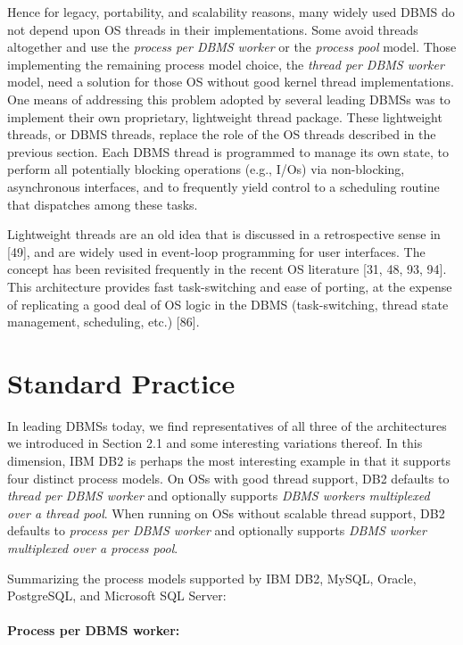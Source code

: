 \documentclass[b5paper,11pt,twoside,openright]{book}
\begin{document}
Hence for legacy, portability, and scalability reasons, many widely used
DBMS do not depend upon OS threads in their implementations. Some avoid
threads altogether and use the \emph{process per DBMS} \emph{worker} or
the \emph{process pool} model. Those implementing the remaining process
model choice, the \emph{thread per DBMS worker} model, need a solution
for those OS without good kernel thread implementations. One means of
addressing this problem adopted by several leading DBMSs
was to implement their own proprietary, lightweight thread package.
These lightweight threads, or DBMS threads, replace the role of the OS
threads described in the previous section. Each DBMS thread is
programmed to manage its own state, to perform all potentially blocking
operations (e.g., I/Os) via non-blocking, asynchronous interfaces, and
to frequently yield control to a scheduling routine that dispatches
among these tasks.

Lightweight threads are an old idea that is discussed in a retrospective
sense in {[}49{]}, and are widely used in event-loop programming for
user interfaces. The concept has been revisited frequently in the recent
OS literature {[}31, 48, 93, 94{]}. This architecture provides fast
task-switching and ease of porting, at the expense of replicating a good
deal of OS logic in the DBMS (task-switching, thread state management,
scheduling, etc.) {[}86{]}.

\hypertarget{standard-practice}{%
\section{Standard Practice}\label{standard-practice}}

In leading DBMSs today, we find representatives of all three of the
architectures we introduced in Section 2.1 and some interesting
variations thereof. In this dimension, IBM DB2 is perhaps the most
interesting example in that it supports four distinct process models. On
OSs with good thread support, DB2 defaults to \emph{thread per DBMS
worker} and optionally supports \emph{DBMS workers multiplexed over a
thread pool}. When running on OSs without scalable thread support, DB2
defaults to \emph{process per DBMS worker} and optionally supports
\emph{DBMS worker} \emph{multiplexed over a process pool}.

Summarizing the process models supported by IBM DB2, MySQL, Oracle,
PostgreSQL, and Microsoft SQL Server:

\paragraph{Process per DBMS worker:}
\end{document}
